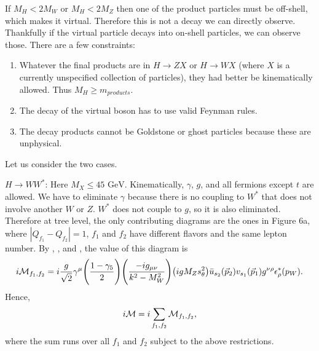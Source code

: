 If $M_H<2M_W$ or $M_H<2M_Z$ then one of the product particles must be
off-shell, which makes it virtual. Therefore this is not a decay we can
directly observe. Thankfully if the virtual particle decays into on-shell
particles, we can observe those. There are a few constraints:
\begin{enumerate}
  \item Whatever the final products are in $H\to ZX$ or $H\to WX$ (where $X$ is
        a currently unspecified collection of particles), they had better be
        kinematically allowed. Thus $M_H\geq m_{products}$.
  \item The decay of the virtual boson has to use valid Feynman rules.
  \item The decay products cannot be Goldstone or ghost particles because these
        are unphysical.
\end{enumerate}
Let us consider the two cases.

\underline{$H\to WW^*$}: Here $M_X\leq\text{45~GeV}$. Kinematically, $\gamma$,
$g$, and all fermions except $t$ are allowed. We have to eliminate $\gamma$
because there is no coupling to $W^*$ that does not involve another $W$ or $Z$.
$W^*$ does not couple to $g$, so it is also eliminated. Therefore at tree level,
the only contributing diagrams are the ones in Figure 6a, where
$|Q_{f_1}-Q_{f_2}|=1$, $f_1$ and $f_2$ have different flavors and the same
lepton number. By , , and , the value of this diagram is
\begin{equation}
  i\mathcal{M}_{f_1,f_2}=i\frac{g}{\sqrt{2}}\gamma^\mu
    \Bigg(\frac{1-\gamma_5}{2}\Bigg)\Bigg(\frac{-ig_{\mu\nu}}{k^2-M_W^2}\Bigg)
       \big(igM_Zs_{\theta}^2\big)\bar{u}_{s_2}(\vec{p}_2)v_{s_1}(\vec{p}_1)
       g^{\nu\rho}\epsilon^*_\rho(p_W).
\end{equation}
Hence,
\begin{equation}
  i\mathcal{M}=i\sum\limits_{f_1,f_2}\mathcal{M}_{f_1,f_2},
\end{equation}
where the sum runs over all $f_1$ and $f_2$ subject to the above restrictions.

